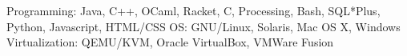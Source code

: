 \begin{cvskills}
    \cvskill
    {Programming:}
    {Java, C++, OCaml, Racket, C, Processing, Bash, SQL*Plus, Python, Javascript, HTML/CSS}
    \cvskill
    {OS:}
    {GNU/Linux, Solaris, Mac OS X, Windows}
    \cvskill
    {Virtualization:}
    {QEMU/KVM, Oracle VirtualBox, VMWare Fusion}\\
\end{cvskills}